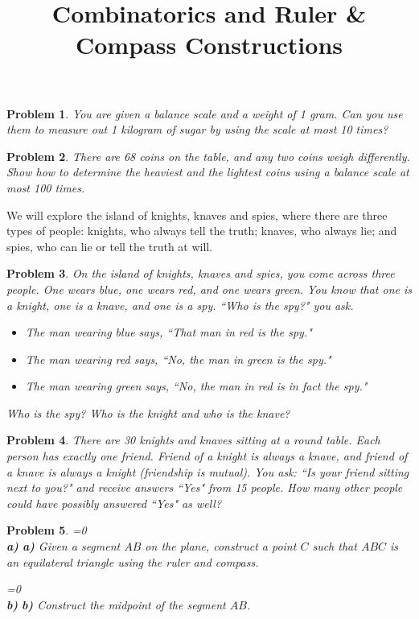 \documentclass[a4paper,12pt]{article}
\title{Combinatorics and Ruler \& Compass Constructions}
\theoremstyle{perfect}
\newtheorem{prb}{Problem}
\newcommand{\varline}{0}
\renewcommand\part[1]{
\ifnum\pdfstrcmp{\varline}{1}=0
    \vspace{.10in}\textbf{\\#1)}
  \else
    \textbf{#1)}
  \fi\renewcommand{\varline}{1}}
\begin{document}
 
\maketitle

\begin{prb}
You are given a balance scale and a weight of 1 gram. Can you use them to measure out 1 kilogram of sugar by using the scale at most 10 times?
\end{prb}

\begin{prb}
There are 68 coins on the table, and any two coins weigh differently. Show how to determine the heaviest and the lightest coins using a balance scale at most 100 times. 
\end{prb}


We will explore the island of knights, knaves and spies, where there are three types of people: knights, who always tell the truth; knaves, who always lie; and spies, who can lie or tell the truth at will.

\begin{prb}
On the island of knights, knaves and spies, you come across three people. One wears blue, one wears red, and one wears green. You know that one is a knight, one is a knave, and one is a spy. 
``Who is the spy?" you ask.

\begin{itemize}
\item The man wearing blue says, ``That man in red is the spy."
\item The man wearing red says, ``No, the man in green is the spy."
\item The man wearing green says, ``No, the man in red is in fact the spy."
\end{itemize}
\noindent
Who is the spy? Who is the knight and who is the knave?
\end{prb}

\begin{prb}
There are 30 knights and knaves sitting at a round table. Each person has exactly one friend. Friend of a knight is always a knave, and friend of a knave is always a knight (friendship is mutual). You ask: ``Is your friend sitting next to you?" and receive answers ``Yes" from 15 people. How many other people could have possibly answered ``Yes" as well?
\end{prb}


\begin{prb}
\part{a} Given a segment $AB$ on the plane, construct a point $C$ such that $ABC$ is an equilateral triangle using the ruler and compass.
\part{b} Construct the midpoint of the segment $AB$. 
\end{prb}
\end{document}
